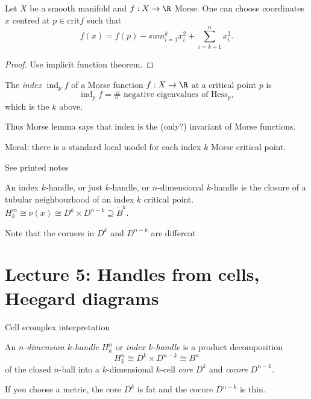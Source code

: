 \documentclass[a4paper]{article}
\newcommand{\interior}{\ocirc}
\begin{document}
\begin{lemma}
  Let \(X\) be a smooth manifold and \(f: X \to \R\) Morse. One can choose coordinates \(x\) centred at \(p \in \textrm{crit} f\) such that
  \[
    f(x) = f(p) - sum_{i = 1}^k x_i^2 + \sum_{i = k + 1}^n x_i^2.
  \]
\end{lemma}

\begin{proof}
  Use implicit function theorem.
\end{proof}

\begin{definition}[index]
  The \emph{index} \(\operatorname{ind}_p f\) of a Morse function \(f: X \to \R\) at a critical point \(p\) is
  \[
    \operatorname{ind}_p f = \# \text{ negative eigenvalues of } \textrm{Hess}_p,
  \]
  which is the \(k\) above.
\end{definition}

Thus Morse lemma says that index is the (only?) invariant of Morse functions.

Moral: there is a standard local model for each index \(k\) Morse critical point.

See printed notes

\begin{definition}[\(k\)-handle]
  An index \(k\)-handle, or just \(k\)-handle, or \(n\)-dimensional \(k\)-handle is the closure of a tubular neighbourhood of an index \(k\) critical point.
  \(H_k^m \cong \nu(x) \cong D^k \times D^{n - k} \supseteq \interior B^k\).
\end{definition}

Note that the corners in \(D^k\) and \(D^{n - k}\) are different

\section{Lecture 5: Handles from cells, Heegard diagrams}

Cell ecomplex interpretation

\begin{definition}
  An \emph{\(n\)-dimension \(k\)-handle} \(H^n_k\) or \emph{index \(k\)-handle} is a product decomposition
  \[
    H^n_k \cong D^k \times D^{n - k} \cong B^n
  \]
  of the closed \(n\)-ball into a \(k\)-dimensional \(k\)-cell \emph{core} \(D^k\) and \emph{cocore} \(D^{n - k}\).
\end{definition}

If you choose a metric, the core \(D^k\) is fat and the cocore \(D^{n - k}\) is thin.
\end{document}
